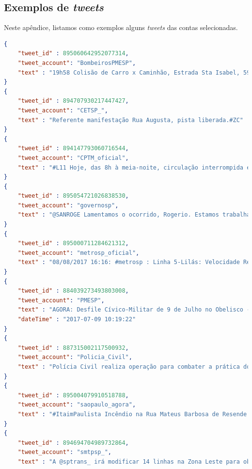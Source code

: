 \documentclass[
	12pt,				%
	oneside,			%
	a4paper,			%
	english,			%
	brazil				%
	]{abntex2ppgsi}
\begin{document}
{{{%
\begin{apendicesenv}

\chapter{Exemplos de \textit{tweets}}
\label{apendiceA}

Neste apêndice, listamos como exemplos alguns \textit{tweets} das contas selecionadas.

\begin{lstlisting}[language=json,title=Exemplos de \textit{tweets} dos perfis selecionados citados na Tabela~\ref{tab:oficialProfiles}, label=tweetsSample]
{
    "tweet_id" : 895060642952077314,
    "tweet_account": "BombeirosPMESP",
    "text" : "19h58 Colisão de Carro x Caminhão, Estrada Sta Isabel, 5950 Itaquaquecetuba. 2 Vítimas, 1 Vtr. Aguardando maiores informes"
}
{
    "tweet_id" : 894707930217447427,
    "tweet_account": "CETSP_",
    "text" : "Referente manifestação Rua Augusta, pista liberada.#ZC"
}
{
    "tweet_id" : 894147793060716544,
    "tweet_account": "CPTM_oficial",
    "text" : "#L11 Hoje, das 8h à meia-noite, circulação interrompida entre Luz e Brás. P/ seguir viagem, use a L7-Rubi q prestará serviço até a Est. Brás"
}
{
    "tweet_id" : 895054721026838530,
    "tweet_account": "governosp",
    "text" : "@SANROGE Lamentamos o ocorrido, Rogerio. Estamos trabalhando continuamente para melhorar a segurança na região. Entre maio e junho, [+] [1]"
}
{
    "tweet_id" : 895000711284621312,
    "tweet_account": "metrosp_oficial",
    "text" : "08/08/2017 16:16: #metrosp : Linha 5-Lilás: Velocidade Reduzida. Mais informações em https://t.co/CaeqD26iJR"
}
{
    "tweet_id" : 884039273493803008,
    "tweet_account": "PMESP",
    "text" : "AGORA: Desfile Cívico-Militar de 9 de Julho no Obelisco - Ibirapuera SP, transmissão ao vivo na página oficial Facebook da Polícia Militar.",
    "dateTime" : "2017-07-09 10:19:22"
}
{
    "tweet_id" : 887315002117500932,
    "tweet_account": "Policia_Civil",
    "text" : "Polícia Civil realiza operação para combater a prática do Jogo conhecido como "Baleia Azul"... https://t.co/kh2HW6UZvT",
}
{
    "tweet_id" : 895004079910518788,
    "tweet_account": "saopaulo_agora",
    "text" : "#ItaimPaulista Incêndio na Rua Mateus Barbosa de Resende nº 235. Defesa Civil Regional acionada para o local. (CCOI) #spagora"
}
{
    "tweet_id" : 894694704989732864,
    "tweet_account": "smtpsp_",
    "text" : "A @sptrans_ irá modificar 14 linhas na Zona Leste para obras no Monotrilho Saiba mais: https://t.co/fCA0T7WCSY"

\end{lstlisting}
\end{apendicesenv}}}}
\end{document}
